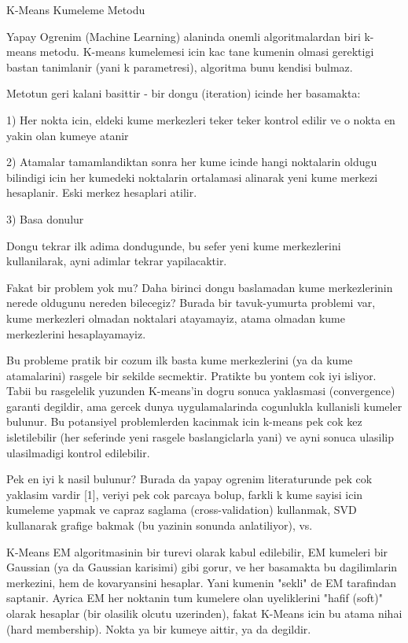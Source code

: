 \documentclass[12pt,fleqn]{article}\usepackage{../common}
\begin{document}
K-Means Kumeleme Metodu

Yapay Ogrenim (Machine Learning) alaninda onemli algoritmalardan biri
k-means metodu. K-means kumelemesi icin kac tane kumenin olmasi
gerektigi bastan tanimlanir (yani k parametresi), algoritma bunu
kendisi bulmaz.

Metotun geri kalani basittir - bir dongu (iteration) icinde her
basamakta:

1) Her nokta icin, eldeki kume merkezleri teker teker kontrol edilir
ve o nokta en yakin olan kumeye atanir

2) Atamalar tamamlandiktan sonra her kume icinde hangi noktalarin
oldugu bilindigi icin her kumedeki noktalarin ortalamasi alinarak yeni
kume merkezi hesaplanir. Eski merkez hesaplari atilir.

3) Basa donulur

Dongu tekrar ilk adima dondugunde, bu sefer yeni kume merkezlerini
kullanilarak, ayni adimlar tekrar yapilacaktir.

Fakat bir problem yok mu? Daha birinci dongu baslamadan kume
merkezlerinin nerede oldugunu nereden bilecegiz? Burada bir
tavuk-yumurta problemi var, kume merkezleri olmadan noktalari
atayamayiz, atama olmadan kume merkezlerini hesaplayamayiz.

Bu probleme pratik bir cozum ilk basta kume merkezlerini (ya da kume
atamalarini) rasgele bir sekilde secmektir. Pratikte bu yontem cok iyi
isliyor. Tabii bu rasgelelik yuzunden K-means'in dogru sonuca
yaklasmasi (convergence) garanti degildir, ama gercek dunya
uygulamalarinda cogunlukla kullanisli kumeler bulunur. Bu potansiyel
problemlerden kacinmak icin k-means pek cok kez isletilebilir (her
seferinde yeni rasgele baslangiclarla yani) ve ayni sonuca ulasilip
ulasilmadigi kontrol edilebilir.

Pek en iyi k nasil bulunur? Burada da yapay ogrenim literaturunde pek
cok yaklasim vardir [1], veriyi pek cok parcaya bolup, farkli k kume
sayisi icin kumeleme yapmak ve capraz saglama (cross-validation)
kullanmak, SVD kullanarak grafige bakmak (bu yazinin sonunda
anlatiliyor), vs.

K-Means EM algoritmasinin bir turevi olarak kabul edilebilir, EM
kumeleri bir Gaussian (ya da Gaussian karisimi) gibi gorur, ve her
basamakta bu dagilimlarin merkezini, hem de kovaryansini
hesaplar. Yani kumenin "sekli" de EM tarafindan saptanir. Ayrica EM
her noktanin tum kumelere olan uyeliklerini "hafif (soft)" olarak
hesaplar (bir olasilik olcutu uzerinden), fakat K-Means icin bu atama
nihai (hard membership). Nokta ya bir kumeye aittir, ya da
degildir.
\end{document}
